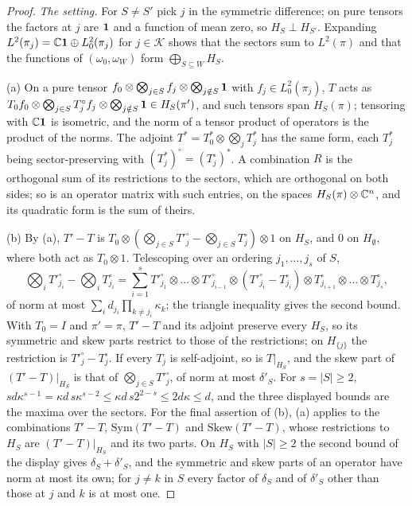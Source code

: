 \begin{proof}
\emph{The setting.} For $S\ne S'$ pick $j$ in the symmetric difference; on pure
tensors the factors at $j$ are $\mathbf 1$ and a function of mean zero, so
$H_S\perp H_{S'}$. Expanding $L^2(\pi_j)=\mathbb C\mathbf 1\oplus L^2_0(\pi_j)$ for
$j\in\mathcal K$ shows that the sectors sum to $L^2(\pi)$ and that the functions
of $(\omega_0,\omega_W)$ form $\bigoplus_{S\subseteq W}H_S$.

(a) On a pure tensor $f_0\otimes\bigotimes_{j\in S}f_j\otimes\bigotimes_{j\notin S}\mathbf 1$
with $f_j\in L^2_0(\pi_j)$, $T$ acts as $T_0f_0\otimes\bigotimes_{j\in S}T_j^\circ
f_j\otimes\bigotimes_{j\notin S}\mathbf 1\in H_S(\pi')$, and such tensors span $H_S(\pi)$;
tensoring with $\mathbb C\mathbf 1$ is isometric, and the norm of a tensor product of
operators is the product of the norms. The adjoint
$T^*=T_0^*\otimes\bigotimes_jT_j^*$ has the same form, each $T_j^*$ being
sector-preserving with $(T_j^*)^\circ=(T_j^\circ)^*$. A combination $R$ is the
orthogonal sum of its restrictions to the sectors, which are orthogonal on both
sides; so is an operator matrix with such entries, on the spaces
$H_S(\pi)\otimes\mathbb C^n$, and its quadratic form is the sum of theirs.

(b) By (a), $T'-T$ is $T_0\otimes(\bigotimes_{j\in S}T'^\circ_j-\bigotimes_{j\in
S}T^\circ_j)\otimes1$ on $H_S$, and $0$ on $H_\emptyset$, where both act as
$T_0\otimes1$. Telescoping over an ordering $j_1,\dots,j_s$ of $S$,
\[
 \bigotimes_iT'^\circ_{j_i}-\bigotimes_iT^\circ_{j_i}=\sum_{i=1}^s
 T'^\circ_{j_1}\otimes\dots\otimes T'^\circ_{j_{i-1}}\otimes
 (T'^\circ_{j_i}-T^\circ_{j_i})\otimes T^\circ_{j_{i+1}}\otimes\dots\otimes T^\circ_{j_s},
\]
of norm at most $\sum_id_{j_i}\prod_{k\ne j_i}\kappa_k$; the triangle inequality
gives the second bound. With $T_0=I$ and $\pi'=\pi$, $T'-T$ and its adjoint
preserve every $H_S$, so its symmetric and skew parts restrict to those of the
restrictions; on $H_{\{j\}}$ the restriction is $T'^\circ_j-T^\circ_j$. If every
$T_j$ is self-adjoint, so is $T|_{H_S}$, and the skew part of $(T'-T)|_{H_S}$ is
that of $\bigotimes_{j\in S}T'^\circ_j$, of norm at most $\delta'_S$. For
$s=|S|\ge2$, $sd\kappa^{s-1}=\kappa d\,s\kappa^{s-2}\le\kappa d\,s2^{2-s}\le
2d\kappa\le d$, and the three displayed bounds are the maxima over the sectors.
For the final assertion of (b), (a) applies to the combinations $T'-T$,
$\mathrm{Sym}(T'-T)$ and $\mathrm{Skew}(T'-T)$, whose restrictions to $H_S$ are
$(T'-T)|_{H_S}$ and its two parts. On $H_S$ with $|S|\ge2$ the second bound of
the display gives $\delta_S+\delta'_S$, and the symmetric and skew parts of an
operator have norm at most its own; for $j\ne k$ in $S$ every factor of
$\delta_S$ and of $\delta'_S$ other than those at $j$ and $k$ is at most one.


\end{proof}
